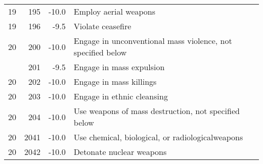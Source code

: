 \documentclass[10pt,]{article}
\begin{document}
\begin{longtable}[t]{rrrl}
19 & 195 & -10.0 & Employ aerial weapons\\
19 & 196 & -9.5 & Violate ceasefire\\
20 & 200 & -10.0 & Engage in unconventional mass violence, not specified below\\
\addlinespace
20 & 201 & -9.5 & Engage in mass expulsion\\
20 & 202 & -10.0 & Engage in mass killings\\
20 & 203 & -10.0 & Engage in ethnic cleansing\\
20 & 204 & -10.0 & Use weapons of mass destruction, not specified below\\
20 & 2041 & -10.0 & Use chemical, biological, or radiologicalweapons\\
20 & 2042 & -10.0 & Detonate nuclear weapons\\
\bottomrule
\end{longtable}

\renewcommand\refname{References}

\end{document}
